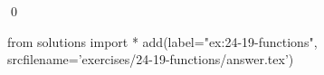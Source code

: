 
\begin{ex}
  \label{ex:24-19-functions}
  
  \qed
\end{ex}
\begin{python0}
from solutions import *
add(label="ex:24-19-functions",
    srcfilename='exercises/24-19-functions/answer.tex')
\end{python0}
